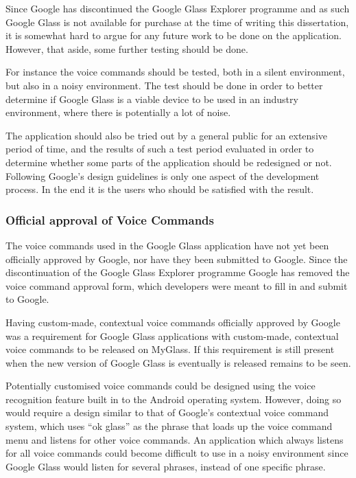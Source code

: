 Since Google has discontinued the Google Glass Explorer programme and as such Google Glass is not available for purchase at the time of writing this dissertation, it is somewhat hard to argue for any future work to be done on the application. However, that aside, some further testing should be done.

For instance the voice commands should be tested, both in a silent environment, but also in a noisy environment. The test should be done in order to better determine if Google Glass is a viable device to be used in an industry environment, where there is potentially a lot of noise. 

The application should also be tried out by a general public for an extensive period of time, and the results of such a test period evaluated in order to determine whether some parts of the application should be redesigned or not. Following Google's design guidelines is only one aspect of the development process. In the end it is the users who should be satisfied with the result.

\subsubsection{Official approval of Voice Commands}
The voice commands used in the Google Glass application have not yet been officially approved by Google, nor have they been submitted to Google. Since the discontinuation of the Google Glass Explorer programme Google has removed the voice command approval form, which developers were meant to fill in and submit to Google.

Having custom-made, contextual voice commands officially approved by Google was a requirement for Google Glass applications with custom-made, contextual voice commands to be released on MyGlass. If this requirement is still present when the new version of Google Glass is eventually is released remains to be seen.

Potentially customised voice commands could be designed using the voice recognition feature built in to the Android operating system. However, doing so would require a design similar to that of Google's contextual voice command system, which uses ``ok glass'' as the phrase that loads up the voice command menu and listens for other voice commands. An application which always listens for all voice commands could become difficult to use in a noisy environment since Google Glass would listen for several phrases, instead of one specific phrase.

